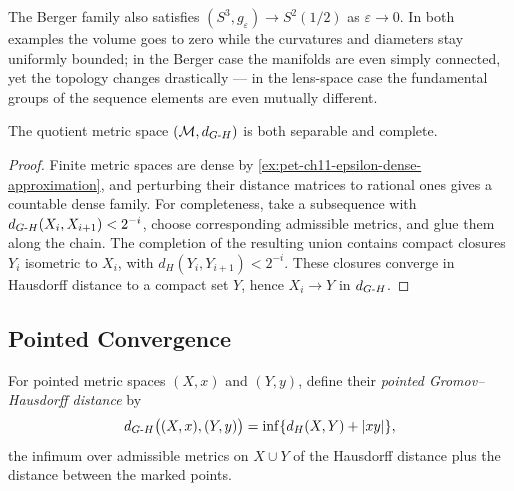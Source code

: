 \begin{example}
  \label{ex:pet-ch11-berger-spheres-limit}
  The Berger family also satisfies $(S^3,g_\varepsilon)\to S^2(1/2)$ as
  $\varepsilon\to0$. In both examples the volume goes to zero while the
  curvatures and diameters stay uniformly bounded; in the Berger case the
  manifolds are even simply connected, yet the topology changes drastically —
  in the lens-space case the fundamental groups of the sequence elements are
  even mutually different.
\end{example}

\begin{proposition}
  \label{prop:pet-ch11-gh-space-separable-complete}
  The quotient metric space $(\mathcal{M},d_{G\text{-}H})$ is both separable and
  complete.
\end{proposition}
\begin{proof}
  \sketch
  Finite metric spaces are dense by
  \cref{ex:pet-ch11-epsilon-dense-approximation}, and perturbing their
  distance matrices to rational ones gives a countable dense family. For completeness, take a subsequence with
  \(d_{G\text{-}H}(X_i,X_{i+1})<2^{-i}\), choose corresponding admissible metrics, and glue them along the chain. The completion of the resulting union contains compact closures \(Y_i\) isometric to \(X_i\), with \(d_H(Y_i,Y_{i+1})<2^{-i}\). These closures converge in Hausdorff distance to a compact set \(Y\), hence \(X_i\to Y\) in \(d_{G\text{-}H}\).
\end{proof}


\subsection{Pointed Convergence}

\begin{definition}
  \label{def:pet-ch11-pointed-gh-distance}
  For pointed metric spaces $(X,x)$ and $(Y,y)$, define their \emph{pointed
  Gromov--Hausdorff distance} by
  \[
    d_{G\text{-}H}\big((X,x),(Y,y)\big)=\inf\{d_H(X,Y)+|xy|\},
  \]
  the infimum over admissible metrics on $X\cup Y$ of the Hausdorff distance
  plus the distance between the marked points.
\end{definition}

